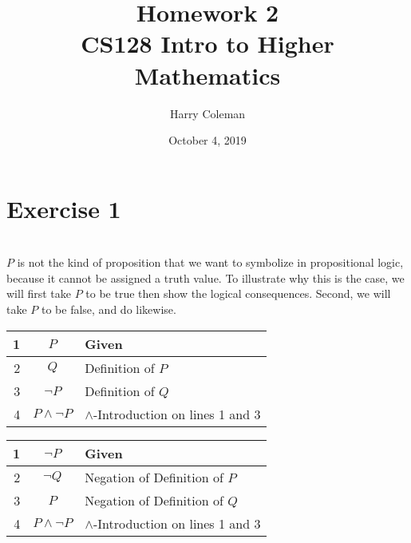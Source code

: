 \documentclass[12pt]{article}
\begin{document}
 
\title{Homework 2\\
    \large CS128 Intro to Higher Mathematics}
\author{Harry Coleman}
\date{October 4, 2019}

\maketitle

\section*{Exercise 1}
\\

$P$ is not the kind of proposition that we want to symbolize in propositional logic, because it cannot be assigned a truth value. To illustrate why this is the case, we will first take $P$ to be true then show the logical consequences. Second, we will take $P$ to be false, and do likewise.

\begin{center}
    \begin{tabular}{|r|c|l|}
        \hline
        1 & $P$ & Given\\
        \hline
        2 & $Q$ & Definition of $P$\\
        \hline
        3 & $\lnot P$ & Definition of $Q$\\
        \hline
        4 & $P\land \lnot P$ & $\land$-Introduction on lines 1 and 3\\
        \hline
    \end{tabular}
\end{center}

\begin{center}
    \begin{tabular}{|r|c|l|}
        \hline
        1 & $\lnot P$ & Given\\
        \hline
        2 & $\lnot Q$ & Negation of Definition of $P$\\
        \hline
        3 & $P$ & Negation of Definition of $Q$\\
        \hline
        4 & $P\land \lnot P$ & $\land$-Introduction on lines 1 and 3\\
        \hline
    \end{tabular}
\end{center}
\end{document}

